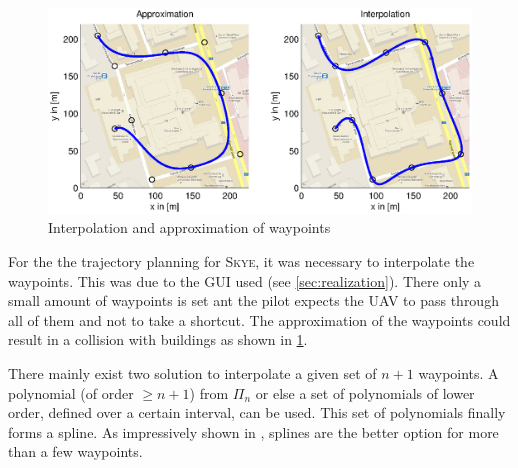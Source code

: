 \begin{figure}[H]
  \begin{minipage}[t]{0.9\textwidth}
    \includegraphics[width = \textwidth]{graphics/ApproxInterpol.eps}
  \end{minipage}
  \hfill
  \begin{minipage}[t]{0.8\textwidth}
  \end{minipage}
  \caption{Interpolation and approximation of waypoints}
  \label{fig:ApproxInterpol}
\end{figure}

For the the trajectory planning for \textsc{Skye}, it was necessary to interpolate the waypoints. This was due to the GUI used (see \ref{sec:realization}). There only a small amount of waypoints is set ant the pilot expects the UAV to pass through all of them and not to take a shortcut. The approximation of the waypoints could result in a collision with buildings as shown in \ref{fig:ApproxInterpol}.


There mainly exist two solution to interpolate a given set of $n+1$ waypoints. A polynomial (of order $\ge n+1$) from $\varPi_{n}$ or else a set of polynomials of lower order, defined over a certain interval, can be used. This set of polynomials finally forms a spline. As impressively shown in \cite{wolfgang}, splines are the better option for more than a few waypoints. 



